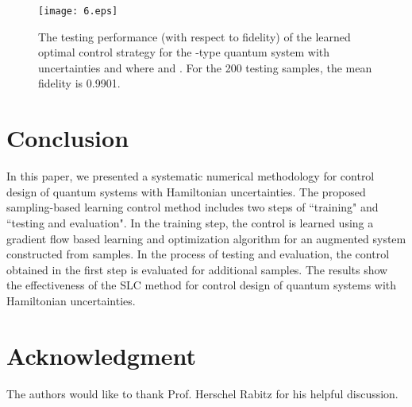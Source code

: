 \documentclass[letterpaper, 10 pt, conference]{ieeeconf}
\begin{document}
\begin{figure*}\label{fig6}
\centering
\texttt{[image: 6.eps]}
\caption{The testing performance (with respect to fidelity) of the
learned optimal control strategy for the -type  quantum system with
uncertainties  and  where  and .
For the 200 testing samples, the mean fidelity is 0.9901.}
\end{figure*}

\section{Conclusion}\label{Sec5}
In this paper, we presented a systematic numerical methodology for control
design of quantum systems with Hamiltonian uncertainties. The proposed sampling-based learning control method
includes two steps of ``training" and ``testing and evaluation".
In the training step, the control is learned using a gradient flow based
learning and optimization algorithm for an augmented system
constructed from samples. In the process of testing and evaluation, the control
obtained in the first step is evaluated for additional
samples. The results show the effectiveness of the SLC method for
control design of quantum systems with Hamiltonian uncertainties.

\section*{Acknowledgment}
The authors would like to thank Prof. Herschel Rabitz
for his helpful discussion.
\end{document}
